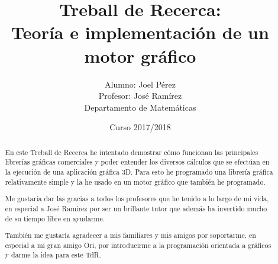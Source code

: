 \documentclass[12pt, a4paper]{report}
\title{Treball de Recerca:\\Teoría e implementación de un motor gráfico}
\date{Curso 2017/2018}
\author{Alumno: Joel Pérez\\Profesor: José Ramírez\\Departamento de Matemáticas}
\begin{document}
\lstset{language=C, basicstyle=\ttfamily}

\maketitle


\newpage


\begin{abstract}
  En este Treball de Recerca he intentado demostrar cómo funcionan las principales librerías gráficas comerciales y poder entender los diversos cálculos que se efectúan en la ejecución de una aplicación gráfica 3D. Para esto he programado una librería gráfica relativamente simple y la he usado en un motor gráfico que también he programado.
\end{abstract}

\renewcommand{\abstractname}{Agradecimientos}
\begin{abstract}
  Me gustaría dar las gracias a todos los profesores que he tenido a lo largo de mi vida, en especial a José Ramírez por ser un brillante tutor que además ha invertido mucho de su tiempo libre en ayudarme.

  También me gustaría agradecer a mis familiares y mis amigos por soportarme, en especial a mi gran amigo Ori, por introducirme a la programación orientada a gráficos y darme la idea para este TdR.

\end{abstract}

\tableofcontents
















\end{document}
